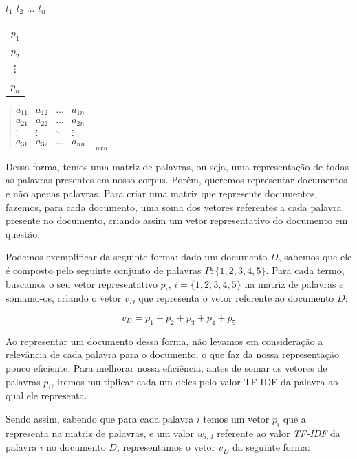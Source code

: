 \documentclass[a4paper,12pt]{article}
\begin{document}
 \begin{center}
 \hspace{0.2cm}$t_{1}$ \hspace{0.5cm} $t_{2}$ \hspace{0.3cm} $\hdots$ \hspace{0.4cm}$t_{n}$
 
 \vspace{0.2cm}
 
\begin{tabular}{c}
   $p_{1}$ \\
   $p_{2}$ \\
   \vdots\\
   $p_{n}$
 \end{tabular}
 $
 \begin{bmatrix}
  a_{11} & a_{12} & \hdots & a_{1n}\\
  a_{21} & a_{22} & \hdots & a_{2n}\\
  \vdots & \vdots & \ddots & \vdots\\
  a_{31} & a_{32} & \hdots & a_{nn}
 \end{bmatrix}_{nxn}
$

\end{center}

Dessa forma, temos uma matriz de palavras, ou seja, uma representação de todas as palavras presentes em nosso corpus.
Porém, queremos representar documentos e não apenas palavras.
Para criar uma matriz que represente documentos, fazemos, para cada documento, uma soma dos vetores referentes a cada palavra presente
no documento, criando assim um vetor representativo do documento em questão.

Podemos exemplificar da seguinte forma: dado um documento $D$, sabemos que ele é composto pelo seguinte conjunto de palavras
$P:\{1,2,3,4,5\}$. Para cada termo, buscamos o seu vetor representativo $p_{i}$, $i =\{1,2,3,4,5\}$ na matriz de
palavras e somamo-os, criando o vetor $v_{D}$ que representa o vetor referente ao documento $D$:

$$v_{D} = p_{1}+p_{2}+p_{3}+p_{4}+p_{5} $$

Ao representar um documento dessa forma, não levamos em consideração a relevância de cada palavra para o documento, o que
faz da nossa representação pouco eficiente. Para melhorar nossa 
eficiência, antes de somar os vetores de palavras $p_{i}$, iremos multiplicar cada um deles pelo valor TF-IDF da palavra
ao qual ele representa.

Sendo assim, sabendo que para cada palavra $i$ temos um vetor $p_{i}$ que a representa na matriz de palavras, e um valor $w_{i,d}$ referente
ao valor \textit{TF-IDF} da palavra $i$ no documento $D$, representamos o vetor $v_{D}$ da seguinte forma:
\end{document}
